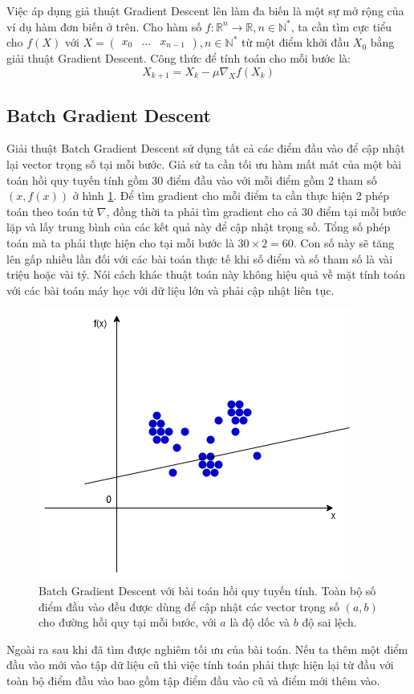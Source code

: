 Việc áp dụng giả thuật Gradient Descent lên làm đa biến là một sự mở rộng của ví dụ hàm đơn biến ở trên. Cho hàm số $f:{{\mathbb{R}}^n}{\rightarrow}{\mathbb{R}}, n{\in}{\mathbb{N}}^*$, ta cần tìm cực tiểu cho $f(X)$ với $X=\begin{pmatrix}x_0 & ... & x_{n-1}\end{pmatrix}, n{\in}{\mathbb{N}}^*$ từ một điểm khởi đầu $X_0$ bằng giải thuật Gradient Descent. Công thức để tính toán cho mỗi bước là:
\begin{equation}
	X_{k+1}=X_{k}-{\mu}{{\nabla}_X}f\left(X_{k}\right)
\end{equation}
\subsection{Batch Gradient Descent}
Giải thuật Batch Gradient Descent sử dụng tất cả các điểm đầu vào để cập nhật lại vector trọng số tại mỗi bước. Giả sử ta cần tối ưu hàm mất mát của một bài toán hồi quy tuyến tính gồm 30 điểm đầu vào với mỗi điểm gồm 2 tham số $\left(x,f\left(x\right)\right)$ ở hình \ref{fig:batch_gradient_descent}. Để tìm gradient cho mỗi điểm ta cần thực hiện 2 phép toán theo toán tử $\nabla$, đồng thời ta phải tìm gradient cho cả 30 điểm tại mỗi bước lặp và lấy trung bình của các kết quả này để cập nhật trọng số. Tổng số phép toán mà ta phải thực hiện cho tại mỗi bước là $30\times2=60$. Con số này sẽ tăng lên gấp nhiều lần đối với các bài toán thực tế khi số điểm và số tham số là vài triệu hoặc vài tỷ. Nói cách khác thuật toán này không hiệu quả về mặt tính toán với các bài toán máy học với dữ liệu lớn và phải cập nhật liên tục.
\begin{figure}[ht!]
	\centerline{\includegraphics[scale=0.6]{images/batch_gradient_descent.png}}
  	\caption{Batch Gradient Descent với bài toán hồi quy tuyến tính. Toàn bộ số điểm đầu vào đều được dùng để cập nhật các vector trọng số $(a,b)$ cho đường hồi quy tại mỗi bước, với $a$ là độ dốc và $b$ độ sai lệch.}
  	\label{fig:batch_gradient_descent}
\end{figure}
Ngoài ra sau khi đã tìm được nghiêm tối ưu của bài toán. Nếu ta thêm một điểm đầu vào mới vào tập dữ liệu cũ thì việc tính toán phải thực hiện lại từ đầu với toàn bộ điểm đầu vào bao gồm tập điểm đầu vào cũ và điểm mới thêm vào.
